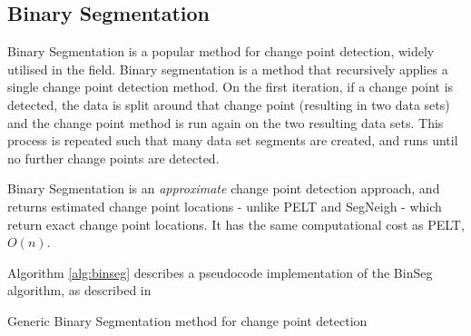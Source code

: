 \documentclass{uvamscse}	%
\begin{document}
\subsection{Binary Segmentation}

Binary Segmentation \cite{Jackson2003} \cite{Yao1984} is a popular method for change point detection, widely utilised in the field. Binary segmentation is a method that recursively applies a single change point detection method. On the first iteration, if a change point is detected, the data is split around that change point (resulting in two data sets) and the change point method is run again on the two resulting data sets. This process is repeated such that many data set segments are created, and runs until no further change points are detected.

Binary Segmentation is an \emph{approximate} change point detection approach, and returns estimated change point locations - unlike PELT and SegNeigh - which return exact change point locations. It has the same computational cost as PELT, $O(n)$.

Algorithm \autoref{alg:binseg} describes a pseudocode implementation of the BinSeg algorithm, as described in \cite{Eckley2011}\newline

\begin{algorithm}[H]
    \label{alg:binseg}
    \caption{Generic Binary Segmentation method for change point detection}
    \DontPrintSemicolon
\end{algorithm}
\end{document}
